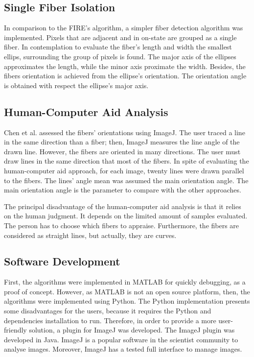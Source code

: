 \documentclass[12pt,a4paper]{article}
\begin{document}
\subsection{Single Fiber Isolation}

In comparison to the FIRE’s algorithm, a simpler fiber detection algorithm was implemented. Pixels that are adjacent and in on-state are grouped as a single fiber. In contemplation to evaluate the fiber’s length and width the smallest ellips, surrounding the group of pixels is found. The major axis of the ellipses approximates the length, while the minor axis proximate the width. Besides, the fibers orientation is achieved from the ellipse's orientation. The orientation angle is obtained with respect the ellipse’s major axis.
\subsection{Human-Computer Aid Analysis}

Chen et al. assessed the fibers' orientations using ImageJ. The user traced a line in the same direction than a fiber; then, ImageJ measures the line angle of the drawn line. However, the fibers are oriented in many directions. The user must draw lines in the same direction that most of the fibers. In spite of evaluating the human-computer aid approach, for each image, twenty lines were drawn parallel to the fibers. The lines' angle mean was assumed the main orientation angle. The main orientation angle is the parameter to compare with the other approaches.

The principal disadvantage of the human-computer aid analysis is that it relies on the human judgment. It depends on the limited amount of samples evaluated. The person has to choose which fibers to appraise. Furthermore, the fibers are considered as straight lines, but actually, they are curves.

\subsection{Software Development}
First, the algorithms were implemented in MATLAB for quickly debugging, as a proof of concept. However, as MATLAB is not an open source platform, then, the algorithms were implemented using Python. The Python implementation presents some disadvantages for the users, because it requires the Python and dependencies installation to run. Therefore, in order to provide a more user-friendly solution, a plugin for ImageJ was developed. The ImageJ plugin was developed in Java. ImageJ is a popular software in the scientist community to analyse images. Moreover, ImageJ has a tested full interface to manage images.
\end{document}
